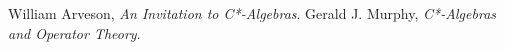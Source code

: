 \begin{thebibliography}{9}
     William Arveson, \emph{An Invitation to C*-Algebras}.
     Gerald J. Murphy, \emph{C*-Algebras and Operator Theory}.
\end{thebibliography}